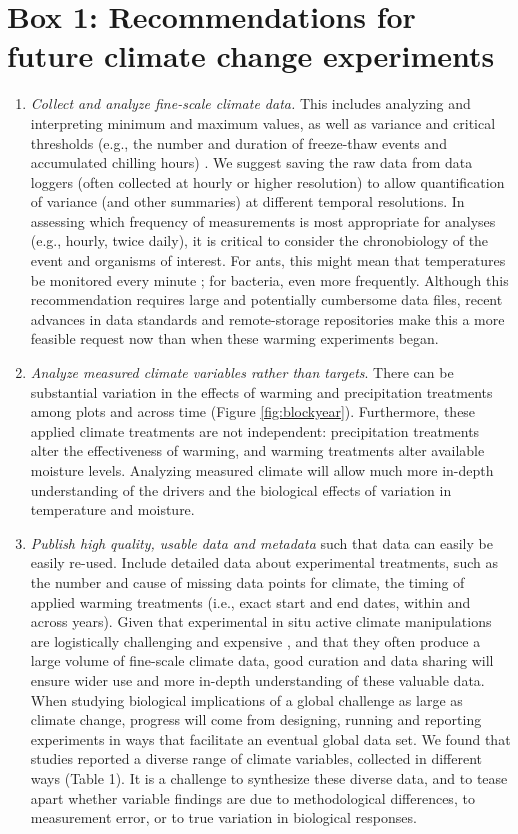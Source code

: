 \documentclass{article}
\begin{document}
\section* {Box 1: Recommendations for future climate change experiments} 
\begin{enumerate}
\item\textit{Collect and analyze fine-scale climate data.} This includes analyzing and interpreting minimum and maximum values, as well as variance and critical thresholds (e.g., the number and duration of freeze-thaw events and accumulated chilling hours) \citep{mcdaniel2014,vasseur2014}. We suggest saving the raw data from data loggers (often collected at hourly or higher resolution) to allow quantification of variance (and other summaries) at different temporal resolutions. In assessing which frequency of measurements is most appropriate for analyses (e.g., hourly, twice daily), it is critical to consider the chronobiology of the event and organisms of interest. For ants, this might mean that temperatures be monitored every minute \citep{shavit2017}; for bacteria, even more frequently. Although this recommendation requires large and potentially cumbersome data files, recent advances in data standards and remote-storage repositories make this a more feasible request now than when these warming experiments began.
\item\textit{Analyze measured climate variables rather than targets}. There can be substantial variation in the effects of warming and precipitation treatments among plots and across time (Figure \ref{fig:blockyear}). Furthermore, these applied climate treatments are not independent: precipitation treatments alter the effectiveness of warming, and warming treatments alter available moisture levels. Analyzing measured climate will allow much more in-depth understanding of the drivers and the biological effects of variation in temperature and moisture. 
\item\textit{Publish high quality, usable data and metadata} such that data can easily be easily re-used. Include detailed data about experimental treatments, such as the number and cause of missing data points for climate, the timing of applied warming treatments (i.e., exact start and end dates, within and across years). Given that experimental in situ active climate manipulations are logistically challenging and expensive \citep{aronson2009}, and that they often produce a large volume of fine-scale climate data, good curation and data sharing will ensure wider use and more in-depth understanding of these valuable data. When studying biological implications of a global challenge as large as climate change, progress will come from designing, running and reporting experiments in ways that facilitate an eventual global data set. We found that studies reported a diverse range of climate variables, collected in different ways (Table 1). It is a challenge to synthesize these diverse data, and to tease apart whether variable findings are due to methodological differences, to measurement error, or to true variation in biological responses. %

\end{enumerate}
\end{document}
